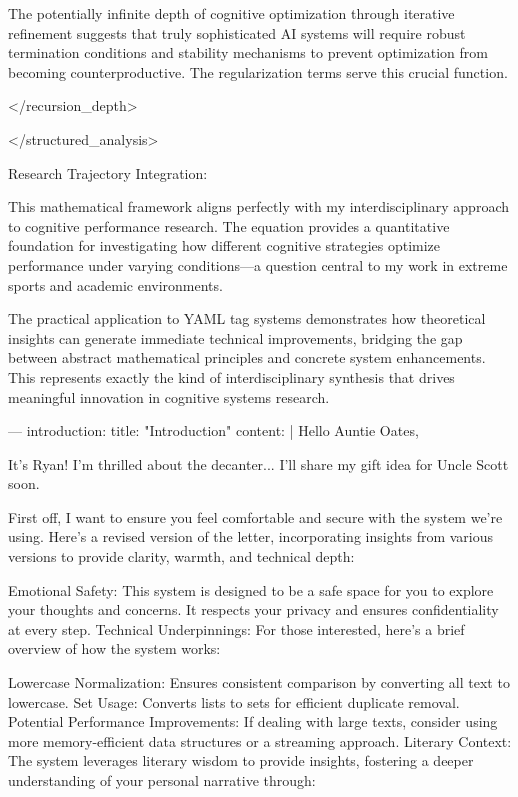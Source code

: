 The potentially infinite depth of cognitive optimization through iterative refinement suggests that truly sophisticated AI systems will require robust termination conditions and stability mechanisms to prevent optimization from becoming counterproductive. The regularization terms serve this crucial function.

</recursion_depth>

</structured_analysis>

Research Trajectory Integration:

This mathematical framework aligns perfectly with my interdisciplinary approach to cognitive performance research. The equation provides a quantitative foundation for investigating how different cognitive strategies optimize performance under varying conditions—a question central to my work in extreme sports and academic environments.

The practical application to YAML tag systems demonstrates how theoretical insights can generate immediate technical improvements, bridging the gap between abstract mathematical principles and concrete system enhancements. This represents exactly the kind of interdisciplinary synthesis that drives meaningful innovation in cognitive systems research.




---
introduction:
  title: "Introduction"
  content: |
    Hello Auntie Oates,

    It's Ryan! I'm thrilled about the decanter... I'll share my gift idea for Uncle Scott soon.

    First off, I want to ensure you feel comfortable and secure with the system we're using. Here's a revised version of the letter, incorporating insights from various versions to provide clarity, warmth, and technical depth:

Emotional Safety: This system is designed to be a safe space for you to explore your thoughts and concerns. It respects your privacy and ensures confidentiality at every step.
Technical Underpinnings: For those interested, here's a brief overview of how the system works:

Lowercase Normalization: Ensures consistent comparison by converting all text to lowercase.
Set Usage: Converts lists to sets for efficient duplicate removal.
Potential Performance Improvements: If dealing with large texts, consider using more memory-efficient data structures or a streaming approach.
Literary Context: The system leverages literary wisdom to provide insights, fostering a deeper understanding of your personal narrative through:

